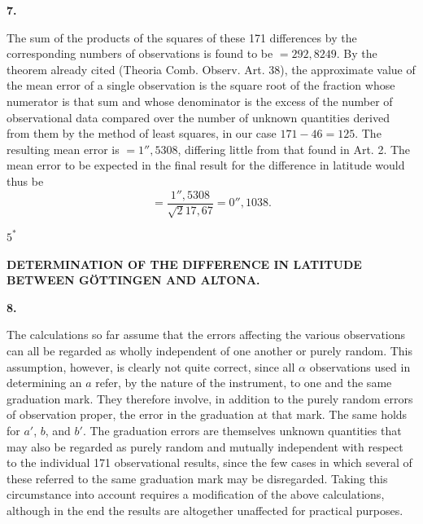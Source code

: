 \begin{center}\textbf{7.}\end{center}

The sum of the products of the squares of these 171 differences by the
corresponding numbers of observations is found to be \(=292{,}8249\). By
the theorem already cited (Theoria Comb. Observ. Art. 38), the approximate
value of the mean error of a single observation is the square root of the
fraction whose numerator is that sum and whose denominator is the excess
of the number of observational data compared over the number of unknown
quantities derived from them by the method of least squares, in our case
\(171-46=125\). The resulting mean error is \(=1''{,}5308\), differing little from that
found in Art. 2. The mean error to be expected
in the final result for the
difference in latitude would thus be
\[
=\frac{1''{,}5308}{\surd 217{,}67}=0''{,}1038.
\]
\par\vfill
\noindent\hfill \(5^{*}\)\hspace{.12\textwidth}\par

\par\clearpage
\noindent{}\parbox[t]{\dimexpr\linewidth-24mm\relax}{\centering\scriptsize\bfseries DETERMINATION OF THE DIFFERENCE IN LATITUDE BETWEEN GÖTTINGEN AND ALTONA.}\makebox[12mm][r]{}\par\medskip

\begin{center}\textbf{8.}\end{center}

The calculations so far assume that the errors affecting the various
observations can all be regarded as wholly independent of one another
or purely random. This assumption, however, is clearly not quite correct,
since all \(\alpha\) observations used in determining an \(a\) refer, by the
nature of the instrument, to one and the same graduation mark. They therefore
involve, in addition to the purely random errors of observation proper,
the error in the graduation at that mark.
The same holds for \(a'\), \(b\), and \(b'\). The graduation errors are themselves
unknown quantities that may also be regarded as purely random and mutually
independent with respect to the individual 171 observational results, since
the few cases in which several of these referred to the same graduation mark
may be disregarded. Taking this circumstance into account requires a
modification of the above calculations,
although in the end the results
are altogether unaffected for practical purposes.

